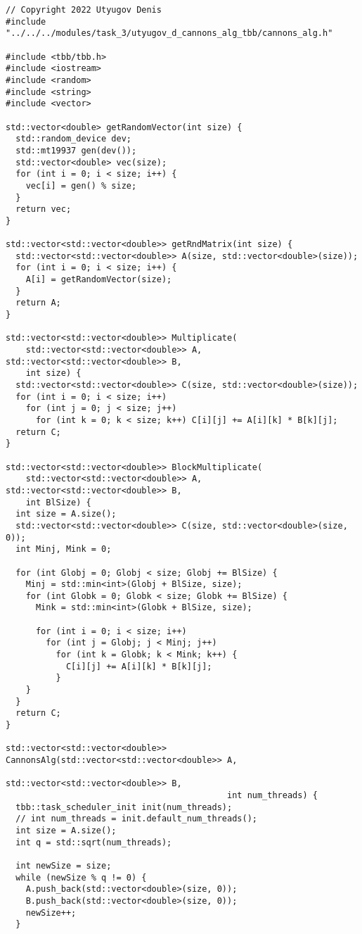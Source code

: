 \documentclass{report}
\begin{document}
\begin{lstlisting}
// Copyright 2022 Utyugov Denis
#include "../../../modules/task_3/utyugov_d_cannons_alg_tbb/cannons_alg.h"

#include <tbb/tbb.h>
#include <iostream>
#include <random>
#include <string>
#include <vector>

std::vector<double> getRandomVector(int size) {
  std::random_device dev;
  std::mt19937 gen(dev());
  std::vector<double> vec(size);
  for (int i = 0; i < size; i++) {
    vec[i] = gen() % size;
  }
  return vec;
}

std::vector<std::vector<double>> getRndMatrix(int size) {
  std::vector<std::vector<double>> A(size, std::vector<double>(size));
  for (int i = 0; i < size; i++) {
    A[i] = getRandomVector(size);
  }
  return A;
}

std::vector<std::vector<double>> Multiplicate(
    std::vector<std::vector<double>> A, std::vector<std::vector<double>> B,
    int size) {
  std::vector<std::vector<double>> C(size, std::vector<double>(size));
  for (int i = 0; i < size; i++)
    for (int j = 0; j < size; j++)
      for (int k = 0; k < size; k++) C[i][j] += A[i][k] * B[k][j];
  return C;
}

std::vector<std::vector<double>> BlockMultiplicate(
    std::vector<std::vector<double>> A, std::vector<std::vector<double>> B,
    int BlSize) {
  int size = A.size();
  std::vector<std::vector<double>> C(size, std::vector<double>(size, 0));
  int Minj, Mink = 0;

  for (int Globj = 0; Globj < size; Globj += BlSize) {
    Minj = std::min<int>(Globj + BlSize, size);
    for (int Globk = 0; Globk < size; Globk += BlSize) {
      Mink = std::min<int>(Globk + BlSize, size);

      for (int i = 0; i < size; i++)
        for (int j = Globj; j < Minj; j++)
          for (int k = Globk; k < Mink; k++) {
            C[i][j] += A[i][k] * B[k][j];
          }
    }
  }
  return C;
}

std::vector<std::vector<double>> CannonsAlg(std::vector<std::vector<double>> A,
                                            std::vector<std::vector<double>> B,
                                            int num_threads) {
  tbb::task_scheduler_init init(num_threads);
  // int num_threads = init.default_num_threads();
  int size = A.size();
  int q = std::sqrt(num_threads);

  int newSize = size;
  while (newSize % q != 0) {
    A.push_back(std::vector<double>(size, 0));
    B.push_back(std::vector<double>(size, 0));
    newSize++;
  }


\end{lstlisting}
\end{document}
